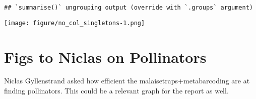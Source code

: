 \documentclass[]{article}
\newenvironment{Shaded}{\begin{snugshade}}{\end{snugshade}}
\newcommand{\DataTypeTok}[1]{\textcolor[rgb]{0.13,0.29,0.53}{#1}}
\newcommand{\DecValTok}[1]{\textcolor[rgb]{0.00,0.00,0.81}{#1}}
\newcommand{\KeywordTok}[1]{\textcolor[rgb]{0.13,0.29,0.53}{\textbf{#1}}}
\newcommand{\NormalTok}[1]{#1}
\newcommand{\OperatorTok}[1]{\textcolor[rgb]{0.81,0.36,0.00}{\textbf{#1}}}
\newcommand{\StringTok}[1]{\textcolor[rgb]{0.31,0.60,0.02}{#1}}
\begin{document}
\begin{Shaded}
\end{Shaded}

\begin{verbatim}
## `summarise()` ungrouping output (override with `.groups` argument)
\end{verbatim}

\texttt{[image: figure/no\_col\_singletons-1.png]}

\hypertarget{figs-to-niclas-on-pollinators}{%
\section{Figs to Niclas on
Pollinators}\label{figs-to-niclas-on-pollinators}}

Niclas Gyllenstrand asked how efficient the malaisetraps+metabarcoding
are at finding pollinators. This could be a relevant graph for the
report as well.
\end{document}
